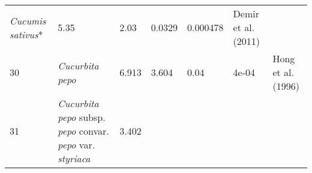 \documentclass[]{article}
\begin{document}
\begin{longtable}[]{@{}lllllll@{}}
\begin{minipage}[t]{0.23\columnwidth}
\emph{Cucumis sativus}*\strut
\end{minipage} & \begin{minipage}[t]{0.05\columnwidth}\raggedright
5.35\strut
\end{minipage} & \begin{minipage}[t]{0.08\columnwidth}\raggedright
2.03\strut
\end{minipage} & \begin{minipage}[t]{0.08\columnwidth}\raggedright
0.0329\strut
\end{minipage} & \begin{minipage}[t]{0.08\columnwidth}\raggedright
0.000478\strut
\end{minipage} & \begin{minipage}[t]{0.23\columnwidth}\raggedright
Demir et al. (2011)\strut
\end{minipage}\tabularnewline
\begin{minipage}[t]{0.05\columnwidth}\raggedright
30\strut
\end{minipage} & \begin{minipage}[t]{0.23\columnwidth}\raggedright
\emph{Cucurbita pepo}\strut
\end{minipage} & \begin{minipage}[t]{0.05\columnwidth}\raggedright
6.913\strut
\end{minipage} & \begin{minipage}[t]{0.08\columnwidth}\raggedright
3.604\strut
\end{minipage} & \begin{minipage}[t]{0.08\columnwidth}\raggedright
0.04\strut
\end{minipage} & \begin{minipage}[t]{0.08\columnwidth}\raggedright
4e-04\strut
\end{minipage} & \begin{minipage}[t]{0.23\columnwidth}\raggedright
Hong et al. (1996)\strut
\end{minipage}\tabularnewline
\begin{minipage}[t]{0.05\columnwidth}\raggedright
31\strut
\end{minipage} & \begin{minipage}[t]{0.23\columnwidth}\raggedright
\emph{Cucurbita pepo} subsp. \emph{pepo} convar. \emph{pepo} var.
\emph{styriaca}\strut
\end{minipage} & \begin{minipage}[t]{0.05\columnwidth}\raggedright
3.402\strut
\end{minipage} & \begin{minipage}[t]{0.08\columnwidth}\raggedright

\end{minipage}
\end{longtable}
\end{document}
